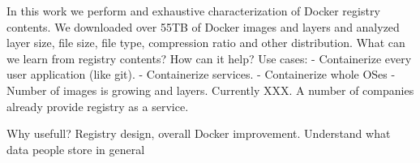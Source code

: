 In this work we perform and exhaustive characterization of Docker registry
contents.
%
We downloaded over 55TB of Docker images and layers and analyzed layer size,
file size, file type, compression ratio and other distribution.
%
What can we learn from registry contents? How can it help?
%
Use cases: 
- Containerize every user application (like git).
- Containerize services.
- Containerize whole OSes - 
%
Number of images is growing and layers. Currently XXX.
%
A number of companies already provide registry as a service.

Why usefull?  Registry design, overall Docker improvement.
Understand what data people store in general
